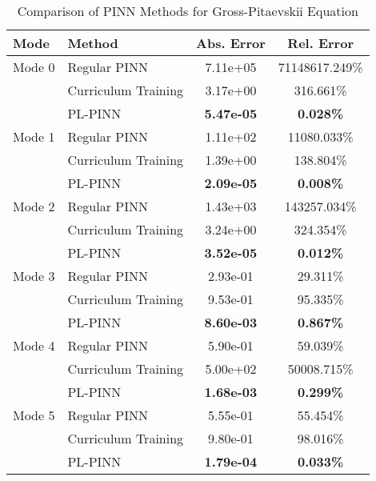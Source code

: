 \begin{table}[htbp]
\centering
\caption{Comparison of PINN Methods for Gross-Pitaevskii Equation}
\label{tab:pinn_comparison}
\begin{tabular}{llcc}
\toprule
Mode & Method & Abs. Error & Rel. Error \\
\midrule
Mode 0 & Regular PINN & 7.11e+05 & 71148617.249\% \\
 & Curriculum Training & 3.17e+00 & 316.661\% \\
 & PL-PINN & \textbf{5.47e-05} & \textbf{0.028\%} \\
\midrule
Mode 1 & Regular PINN & 1.11e+02 & 11080.033\% \\
 & Curriculum Training & 1.39e+00 & 138.804\% \\
 & PL-PINN & \textbf{2.09e-05} & \textbf{0.008\%} \\
\midrule
Mode 2 & Regular PINN & 1.43e+03 & 143257.034\% \\
 & Curriculum Training & 3.24e+00 & 324.354\% \\
 & PL-PINN & \textbf{3.52e-05} & \textbf{0.012\%} \\
\midrule
Mode 3 & Regular PINN & 2.93e-01 & 29.311\% \\
 & Curriculum Training & 9.53e-01 & 95.335\% \\
 & PL-PINN & \textbf{8.60e-03} & \textbf{0.867\%} \\
\midrule
Mode 4 & Regular PINN & 5.90e-01 & 59.039\% \\
 & Curriculum Training & 5.00e+02 & 50008.715\% \\
 & PL-PINN & \textbf{1.68e-03} & \textbf{0.299\%} \\
\midrule
Mode 5 & Regular PINN & 5.55e-01 & 55.454\% \\
 & Curriculum Training & 9.80e-01 & 98.016\% \\
 & PL-PINN & \textbf{1.79e-04} & \textbf{0.033\%} \\
\bottomrule
\end{tabular}
\end{table}
